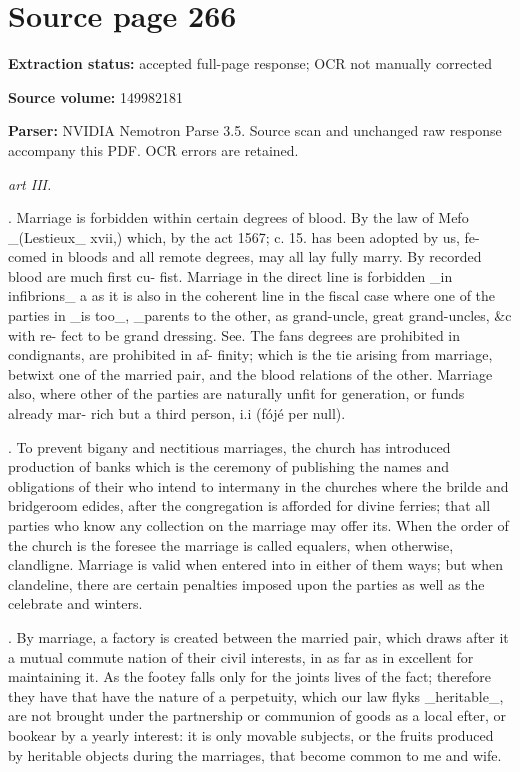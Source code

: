 \clearpage
\section{Source page 266}
\textbf{Extraction status:} accepted full-page response; OCR not manually corrected\par
\textbf{Source volume:} 149982181\par
\textbf{Parser:} NVIDIA Nemotron Parse 3.5. Source scan and unchanged raw response accompany this PDF. OCR errors are retained.\par\medskip
{\small\itshape art III.\par}. Marriage is forbidden within certain degrees of blood. By the law of Mefo \_(Lestieux\_ xvii,) which, by the act 1567; c. 15. has been adopted by us, fe- comed in bloods and all remote degrees, may all lay fully marry. By recorded blood are much first cu- fist. Marriage in the direct line is forbidden \_in infibrions\_ a as it is also in the coherent line in the fiscal case where one of the parties in \_is too\_, \_parents to the other, as grand-uncle, great grand-uncles, \&c with re- fect to be grand dressing. See. The fans degrees are prohibited in condignants, are prohibited in af- finity; which is the tie arising from marriage, betwixt one of the married pair, and the blood relations of the other. Marriage also, where other of the parties are naturally unfit for generation, or funds already mar- rich but a third person, i.i (fójé per null).\par{}. To prevent bigany and nectitious marriages, the church has introduced production of banks which is the ceremony of publishing the names and obligations of their who intend to intermany in the churches where the brilde and bridgeroom edides, after the congregation is afforded for divine ferries; that all parties who know any collection on the marriage may offer its. When the order of the church is the foresee the marriage is called equalers, when otherwise, clandligne. Marriage is valid when entered into in either of them ways; but when clandeline, there are certain penalties imposed upon the parties as well as the celebrate and winters.\par{}. By marriage, a factory is created between the married pair, which draws after it a mutual commute nation of their civil interests, in as far as in excellent for maintaining it. As the footey falls only for the joints lives of the fact; therefore they have that have the nature of a perpetuity, which our law flyks \_heritable\_, are not brought under the partnership or communion of goods as a local efter, or bookear by a yearly interest: it is only movable subjects, or the fruits produced by heritable objects during the marriages, that become common to me and wife.\par\medskip
